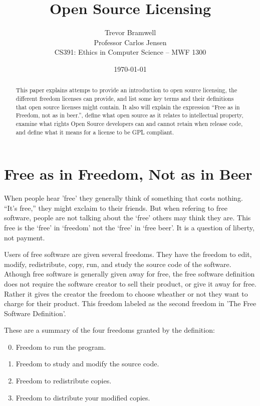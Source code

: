 \documentclass[12pt,letterpaper]{article}
\title{Open Source Licensing}
\author{
    Trevor Bramwell\\
    Professor Carlos Jensen\\
    CS391: Ethics in Computer Science -- MWF 1300\\
}
\date{\today}
\begin{document}
\maketitle

\begin{abstract}
This paper explains attemps to provide an introduction to open source
licensing, the different freedom licenses can provide, and list some key
terms and their definitions that open source licenses might contain.  It
also will explain the expression ``Free as in Freedom, not as in
beer.'', define what open source as it relates to intellectual property,
examine what rights Open Source developers can and cannot retain when
release code, and define what it means for a license to be GPL
compliant.
\end{abstract}


\section*{Free as in Freedom, Not as in Beer}
When people hear 'free' they generally think of something that costs
nothing. ``It's free,'' they might exclaim to their friends. But
when refering to free software, people are not talking about the `free'
others may think they are. This free is the `free' in `freedom' not
the `free' in `free beer'. It is a question of liberty, not payment.

Users of free software are given several freedoms. They have the freedom
to edit, modify, redistribute, copy, run, and study the source code of
the software. Athough free software is
generally given away for free, the free software definition does not
require the software creator to sell their product, or give it away for
free. Rather it gives the creator the freedom to choose wheather or not
they want to charge for their product. This freedom labeled as the
second freedom in 'The Free Software Definition'.

These are a summary of the four freedoms granted by the definition:
    \begin{enumerate}
    \setcounter{enumi}{-1}
        \item Freedom to run the program.
        \item Freedom to study and modify the source code.
        \item Freedom to redistribute copies.
        \item Freedom to distribute your modified copies.
    \end{enumerate}
\end{document}

